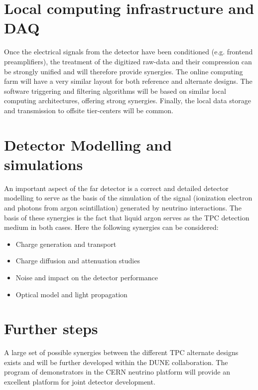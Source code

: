 \section{Local computing infrastructure and DAQ}
Once the electrical signals from the detector have been conditioned
(e.g. frontend preamplifiers), the treatment of the digitized raw-data and
their compression can be strongly unified and will therefore provide
synergies. The online computing farm will have a very similar layout
for both reference and alternate designs. The software triggering and
filtering algorithms will be based on similar local computing
architectures, offering strong synergies. Finally, the local data
storage and transmission to offsite tier-centers will be common.

\section{Detector Modelling and simulations}

An important aspect of the far detector is a correct and detailed
detector modelling to serve as the basis of the simulation of the
signal (ionization electron and photons from argon scintillation)
generated by neutrino interactions. The basis of these synergies is
the fact that liquid argon serves as the TPC detection medium in both
cases. Here the following synergies can be considered:

\begin{itemize}
\item Charge generation and transport
\item Charge diffusion and attenuation studies
\item Noise and impact on the detector performance
\item Optical model and light propagation
\end{itemize}

\section{Further steps}

A large set of possible synergies between the different TPC alternate
designs exists and will be further developed within the DUNE
collaboration.  The program of demonstrators in the CERN neutrino
platform will provide an excellent platform for joint detector
development.
